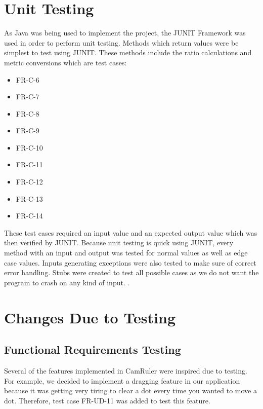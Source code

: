 \documentclass[12pt, titlepage]{article}
\begin{document}
\section{Unit Testing}
As Java was being used to implement the project, the JUNIT Framework was used in order to perform unit testing. Methods which return values were be simplest to test using JUNIT. These methods include the ratio calculations and metric conversions which are test cases:
\begin{itemize}
\item{FR-C-6\\}
\item{FR-C-7\\}
\item{FR-C-8\\}
\item{FR-C-9\\}
\item{FR-C-10\\}
\item{FR-C-11\\}
\item{FR-C-12\\}
\item{FR-C-13\\}
\item{FR-C-14\\}
\end{itemize}

\noindent These test cases required an input value and an expected output value which was then verified by JUNIT. Because unit testing is quick using JUNIT, every method with an input and output was tested for normal values as well as edge case values. Inputs generating exceptions were also tested to make sure of correct error handling. Stubs were created to test all possible cases as we do not want the program to crash on any kind of input. . 

\section{Changes Due to Testing}
\subsection{Functional Requirements Testing}
Several of the features implemented in CamRuler were inspired due to testing. For example, we decided to implement a dragging feature in our application because it was getting very tiring to clear a dot every time you wanted to move a dot. Therefore, test case FR-UD-11 was added to test this feature.
\end{document}
